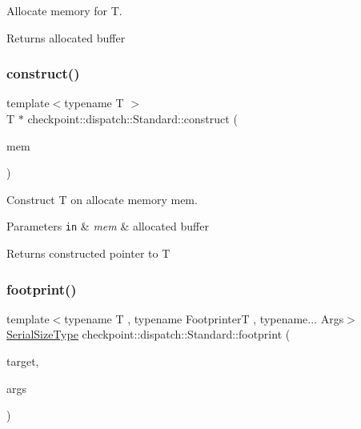 Allocate memory for {\ttfamily T}. 

\begin{DoxyReturn}{Returns}
allocated buffer 
\end{DoxyReturn}
\mbox{\label{structcheckpoint_1_1dispatch_1_1_standard_a532b9767431c5a8515205209474aca11}} 
\subsubsection{\texorpdfstring{construct()}{construct()}}
{\footnotesize\ttfamily template$<$typename T $>$ \\
T $\ast$ checkpoint\+::dispatch\+::\+Standard\+::construct (\begin{DoxyParamCaption}\item[{\hyperlink{namespacecheckpoint_ae57f01cdc0b81776c23b6c7c934c58f5}{Serial\+Byte\+Type} $\ast$}]{mem }\end{DoxyParamCaption})\hspace{0.3cm}{\ttfamily [static]}}



Construct {\ttfamily T} on allocate memory {\ttfamily mem}. 


\begin{DoxyParams}[1]{Parameters}
\mbox{\tt in}  & {\em mem} & allocated buffer\\
\hline
\end{DoxyParams}
\begin{DoxyReturn}{Returns}
constructed pointer to {\ttfamily T} 
\end{DoxyReturn}
\mbox{\label{structcheckpoint_1_1dispatch_1_1_standard_ae48838b6ca5ce60c4521c46b229b7f00}} 
\subsubsection{\texorpdfstring{footprint()}{footprint()}}
{\footnotesize\ttfamily template$<$typename T , typename FootprinterT , typename... Args$>$ \\
\hyperlink{namespacecheckpoint_a083f6674da3f94c2901b18c6d238217c}{Serial\+Size\+Type} checkpoint\+::dispatch\+::\+Standard\+::footprint (\begin{DoxyParamCaption}\item[{T \&}]{target,  }\item[{Args \&\&...}]{args }\end{DoxyParamCaption})\hspace{0.3cm}{\ttfamily [static]}}



